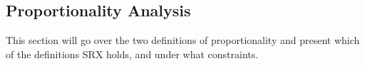 \documentclass[runningheads]{llncs}
\newcommand{\kibitz}[2]{\ifnum\Comments=1{\color{#1}{#2}}\fi}
\newcommand{\rf}[1]{\kibitz{blue}{[Roy says:#1]}}
\begin{document}


 






\subsection{Proportionality Analysis}\label{sec:prop_an}

This section will go over the two definitions of proportionality and present which of the definitions SRX holds, and under what constraints.


\end{document}
